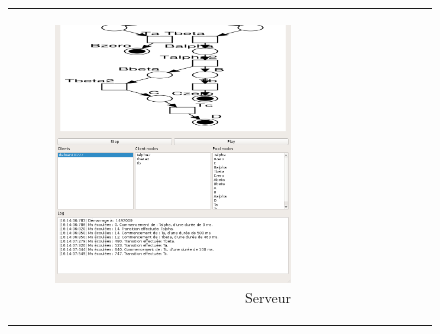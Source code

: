 	\begin{figure}
		\centering
		\begin{tabular}{rl}
			\begin{subfigure}{0.5\textwidth}
				\centering
				\includegraphics[scale=0.45]{images/resultats/vm/serverVMalgo.png}
				\caption{Serveur}
			\end{subfigure}
			&
			\begin{subfigure}{0.5\textwidth}
				\centering

\end{subfigure}
\end{tabular}
\end{figure}
